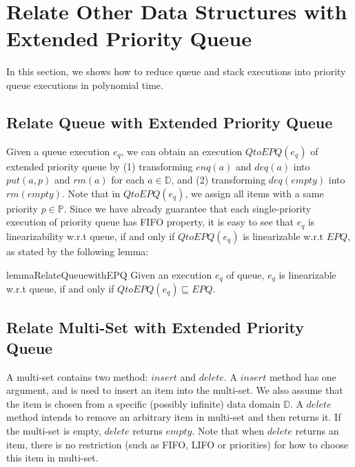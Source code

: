 \section{Relate Other Data Structures with Extended Priority Queue}
\label{sec:relate other data structures with extended priority queue}

In this section, we shows how to reduce queue and stack executions into priority queue executions in polynomial time.


\subsection{Relate Queue with Extended Priority Queue}
\label{subsec:relate queue with extended priority queue}

Given a queue execution $e_q$, we can obtain an execution $\textit{QtoEPQ}(e_q)$ of extended priority queue by (1) transforming $\textit{enq}(a)$ and $\textit{deq}(a)$ into $\textit{put}(a,p)$ and $\textit{rm}(a)$ for each $a \in \mathbb{D}$, and (2) transforming $\textit{deq}(\textit{empty})$ into $\textit{rm}(\textit{empty})$. Note that in $\textit{QtoEPQ}(e_q)$, we assign all items with a same priority $p \in \mathbb{P}$. Since we have already guarantee that each single-priority execution of priority queue has FIFO property, it is easy to see that $e_q$ is linearizability w.r.t queue, if and only if $\textit{QtoEPQ}(e_q)$ is linearizable w.r.t $\textit{EPQ}$, as stated by the following lemma:

\begin{restatable}{lemma}{RelateQueuewithEPQ}
\label{lemma:relate queue with extended priority queue}
Given an execution $e_q$ of queue, $e_q$ is linearizable w.r.t queue, if and only if $\textit{QtoEPQ}(e_q) \sqsubseteq \textit{EPQ}$.
\end{restatable}


\subsection{Relate Multi-Set with Extended Priority Queue}
\label{subsec:relate multiSet with extended priority queue}

A multi-set contains two method: $\textit{insert}$ and $\textit{delete}$. A $\textit{insert}$ method has one argument, and is used to insert an item into the multi-set. We also assume that the item is chosen from a specific (possibly infinite) data domain $\mathbb{D}$. A $\textit{delete}$ method intends to remove an arbitrary item in multi-set and then returns it. If the multi-set is empty, $\textit{delete}$ returns $\textit{empty}$. Note that when $\textit{delete}$ returns an item, there is no restriction (such as FIFO, LIFO or priorities) for how to choose this item in multi-set.

